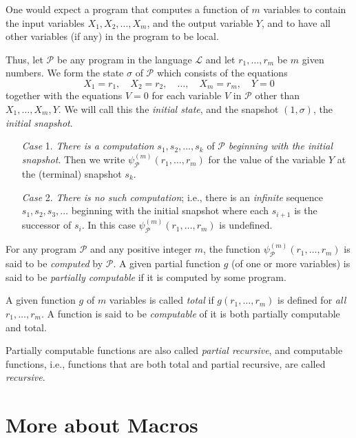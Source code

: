 \documentclass[12pt,a4paper,twoside,openany]{book}
\begin{document}
One would expect a program that computes a function of $m$ variables to contain the input variables $X_1,X_2,\ldots,X_m$, and the output variable $Y$, and to have all other variables (if any) in the program to be local.

Thus, let $\mathscr{P}$ be any program in the language $\mathscr{L}$ and let $r_1,\ldots,r_m$ be $m$ given numbers. We form the state $\sigma$ of $\mathscr{P}$ which consists of the equations $$X_1=r_1,\quad X_2=r_2,\quad \ldots,\quad X_m=r_m,\quad Y=0$$ together with the equations $V=0$ for each variable $V$ in $\mathscr{P}$ other than $X_1,\ldots,X_m,Y$. We will call this the \textit{initial state}, and the snapshot $(1,\sigma)$, the \textit{initial snapshot}.

\begin{itemize}
    \item[\textit{Case} 1.] \textit{There is a computation} $s_1,s_2,\ldots,s_k$ of $\mathscr{P}$ \textit{beginning with the initial snapshot}. Then we write $\psi_{\mathscr{P}}^{(m)}(r_1,\ldots,r_m)$ for the value of the variable $Y$ at the (terminal) snapshot $s_k$.
    \item[\textit{Case} 2.] \textit{There is no such computation}; i.e., there is an \textit{infinite} sequence $s_1,s_2,s_3,\ldots$ beginning with the initial snapshot where each $s_{i+1}$ is the successor of $s_i$. In this case $\psi_{\mathscr{P}}^{(m)}(r_1,\ldots,r_m)$ is undefined.
\end{itemize}

For any program $\mathscr{P}$ and any positive integer $m$, the function $\psi_{\mathscr{P}}^{(m)}(r_1,\ldots,r_m)$ is said to be \textit{computed} by $\mathscr{P}$. A given partial function $g$ (of one or more variables) is said to be \textit{partially computable} if it is computed by some program.

A given function $g$ of $m$ variables is called \textit{total} if $g(r_1,\ldots,r_m)$ is defined for \textit{all} $r_1,\ldots,r_m$. A function is said to be \textit{computable} of it is both partially computable and total.

Partially computable functions are also called \textit{partial recursive}, and computable functions, i.e., functions that are both total and partial recursive, are called \textit{recursive}.

\section{More about Macros}
\end{document}
